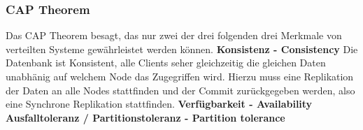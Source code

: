 \begin{table}[]
\caption{Quorum Beispiele}
\label{tab:quorum-beispiele}
\end{table}
\subsubsection{CAP Theorem}
Das CAP Theorem besagt, das nur zwei der drei folgenden drei Merkmale von verteilten Systeme gewährleistet werden können\cite{EE6EQHU2}.
\textbf{Konsistenz - Consistency}
Die Datenbank ist Konsistent, alle Clients seher gleichzeitig die gleichen Daten unabhänig auf welchem Node das Zugegriffen wird.
Hierzu muss eine Replikation der Daten an alle Nodes stattfinden und der Commit zurückgegeben werden, also eine Synchrone Replikation stattfinden.
\textbf{Verfügbarkeit - Availability}
\textbf{Ausfalltoleranz / Partitionstoleranz - Partition tolerance}

